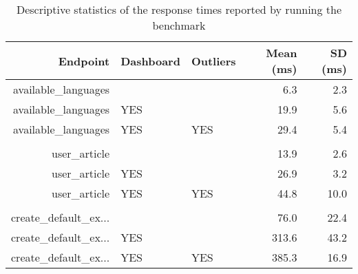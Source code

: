 
\newcommand{\yes}{YES}

\begin{table}[tb]
	
	\centering

	\begin{tabular}{rllrr}
		\toprule
		\bfseries Endpoint & \bfseries Dashboard & \bfseries Outliers & \bfseries Mean (ms) & \bfseries SD (ms) \\

		\midrule

	         available\_languages  &    &	    &   6.3 &  2.3 \\ 
	         available\_languages  &  \yes &    &  19.9 &  5.6 \\ 
	         available\_languages  &  \yes &  \yes &  29.4 &  5.4 \\ \\ 

	                user\_article  &    &	    &  13.9 &  2.6 \\
	                user\_article  &  \yes &    &  26.9 &  3.2 \\
	                user\_article  &  \yes &  \yes &  44.8 & 10.0 \\ \\

	    create\_default\_ex...     &    &	    &  76.0 & 22.4 \\ 
	    create\_default\_ex...     &  \yes &    & 313.6 & 43.2 \\
	    create\_default\_ex...     &  \yes &  \yes & 385.3 & 16.9 \\
	
		\bottomrule

	\end{tabular}
	\caption{Descriptive statistics of the response times reported by running the benchmark}
	\label{tab:benchmark}

\end{table}


